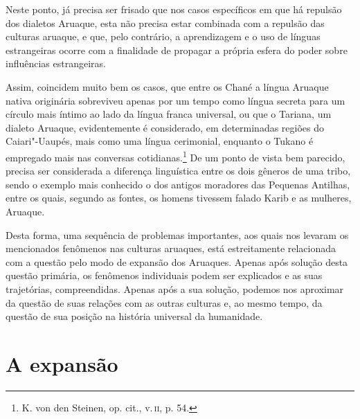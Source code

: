 Neste ponto, já precisa ser frisado que nos casos específicos em que há
repulsão dos dialetos Aruaque, esta não precisa estar combinada com a
repulsão das culturas aruaque, e que, pelo contrário, a aprendizagem e o
uso de línguas estrangeiras ocorre com a finalidade de propagar a
própria esfera do poder sobre influências estrangeiras.

Assim, coincidem muito bem os casos, que entre os Chané a língua Aruaque
nativa originária sobreviveu apenas por um tempo como língua secreta
para um círculo mais íntimo ao lado da língua franca universal, ou que o
Tariana, um dialeto Aruaque, evidentemente é considerado, em
determinadas regiões do Caiari"-Uaupés, mais como uma língua cerimonial,
enquanto o Tukano é empregado mais nas conversas cotidianas.\footnote{K.
  von den Steinen, op. cit., v.\,\textsc{ii}, p. 54.} De um ponto de vista bem
parecido, precisa ser considerada a diferença linguística entre os dois
gêneros de uma tribo, sendo o exemplo mais conhecido o dos antigos
moradores das Pequenas Antilhas, entre os quais, segundo as fontes, os
homens tivessem falado Karib e as mulheres, Aruaque.

Desta forma, uma sequência de problemas importantes, aos quais nos
levaram os mencionados fenômenos nas culturas aruaques, está
estreitamente relacionada com a questão pelo modo de expansão dos
Aruaques. Apenas após solução desta questão primária, os fenômenos
individuais podem ser explicados e as suas trajetórias, compreendidas.
Apenas após a sua solução, podemos nos aproximar da questão de suas
relações com as outras culturas e, ao mesmo tempo, da questão de sua
posição na história universal da humanidade.


\chapter*{A expansão\smallskip{}}

